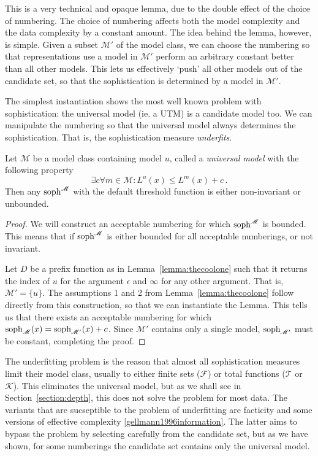 \documentclass{style/llncs}
\newcommand{\M}{\mathscr M}
\newcommand{\T}{\mathscr T}
\newcommand{\F}{\mathscr F}
\newcommand{\K}{\mathscr K}
\newcommand{\tn}[1]{\textnormal{#1}}
\newcommand{\s}{\tn{soph}}
\newcommand{\p}{\,\text{.}}
\begin{document}
This is a very technical and opaque lemma, due to the double effect of the choice of numbering. The choice of numbering affects both the model complexity and the data complexity by a constant amount. The idea behind the lemma, however, is simple. Given a subset $\M'$ of the model class, we can choose the numbering so that representations use a model in $\M'$ perform an arbitrary constant better than all other models. This lets us effectively `push' all other models out of the candidate set, so that the sophistication is determined by a model in $\M'$.

The simplest instantiation shows the most well known problem with sophistication: the universal model (ie. a UTM) is a candidate model too. We can manipulate the numbering so that the universal model always determines the sophistication. That is, the sophistication measure \emph{underfits}.

\begin{lemma}[underfitting]
Let $\M$ be a model class containing model $u$, called a \emph{universal model} with the following property
\[
\exists c \forall m \in \M : L^u(x) \leq L^m(x) + c \p
\]  
Then any $\s^\M$ with the default threshold function is either non-invariant or unbounded.
\end{lemma}
\begin{proof}
We will construct an acceptable numbering for which $\s^\M$ is bounded. This means that if $\s^\M$
 is either bounded for all acceptable numberings, or not invariant.
 
Let $D$ be a prefix function as in Lemma~\ref{lemma:thecoolone} such that it returns the index of $u$ for the argument $\epsilon$ and $\infty$ for any other argument. That is, $\M' = \{u\}$. The assumptions 1 and 2 from Lemma~\ref{lemma:thecoolone} follow directly from this construction, so that we can instantiate the Lemma. This tells us that there exists an acceptable numbering for which $\s_\M(x) = \s_{\M'}(x) + c$. Since $\M'$ contains only a single model, $\s_{\M'}$ must be constant, completing the proof.
\end{proof}

The underfitting problem is the reason that almost all sophistication measures limit their model class, usually to either finite sets ($\F$) or total functions ($\T$ or $\K$). This eliminates the universal model, but as we shall see in Section~\ref{section:depth}, this does not solve the problem for most data. The variants that are sucseptible to the problem of underfitting are facticity \cite{adriaans2012facticity} and some versions of effective complexity \ref{gellmann1996information}. The latter aims to bypass the problem by selecting carefully from the candidate set, but as we have shown, for some numberings the candidate set contains only the universal model. 
\end{document}
